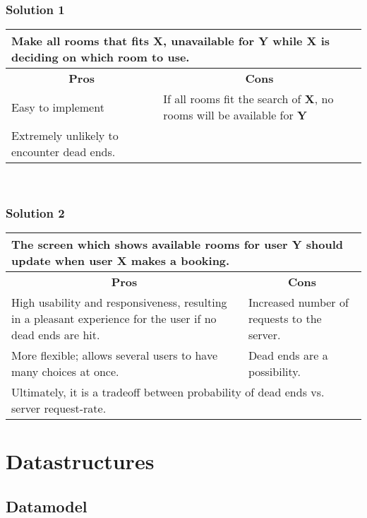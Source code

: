 \subsubsection*{Solution 1}
\begin{tabular}{|p{6cm}|p{6cm}|}
\hline
	\multicolumn{2}{|p{12cm}|}{Make all rooms that fits \textbf{X}, unavailable for \textbf{Y} while \textbf{X} is deciding on which room to use.} \\ \hline \hline
	\multicolumn{1}{|c|}{\textbf{Pros}} & \multicolumn{1}{c|}{\textbf{Cons}} \\ \hline
	Easy to implement & If all rooms fit the search of \textbf{X}, no rooms will be available for \textbf{Y} \\ \hline
	Extremely unlikely to encounter dead ends. & \\
	\hline
\end{tabular}
\\
\subsubsection*{Solution 2}
\begin{tabular}{|p{6cm}|p{6cm}|}
\hline
	\multicolumn{2}{|p{12cm}|}{The screen which shows available rooms for user \textbf{Y} should update when user \textbf{X} makes a booking.} \\ \hline \hline
	\multicolumn{1}{|c|}{\textbf{Pros}} & \multicolumn{1}{c|}{\textbf{Cons}} \\ \hline
	High usability and responsiveness, resulting in a pleasant experience for the user if no dead ends are hit. & Increased number of requests to the server. \\ \hline
	More flexible; allows several users to have many choices at once. & Dead ends are a possibility. \\
	\hline
	\multicolumn{2}{|p{12cm}|}{Ultimately, it is a tradeoff between probability of dead ends vs. server request-rate.} \\
	\hline
\end{tabular}

\section{Datastructures}

\subsection{Datamodel}

